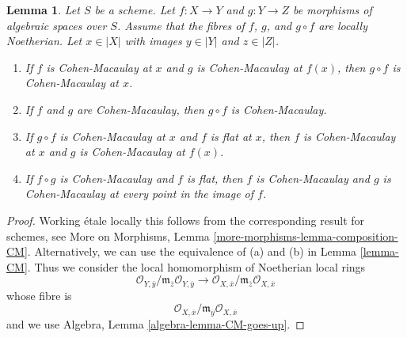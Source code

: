 \documentclass[10pt,a4paper]{amsart}
\theoremstyle{plain}
\newtheorem{lemma}[subsection]{Lemma}
\theoremstyle{definition}
\theoremstyle{remark}
\numberwithin{equation}{subsection}
\begin{document}
\begin{lemma}
\label{lemma-composition-CM}
Let $S$ be a scheme.
Let $f : X \to Y$ and $g : Y \to Z$ be morphisms of algebraic spaces
over $S$. Assume that the
fibres of $f$, $g$, and $g \circ f$ are locally Noetherian.
Let $x \in |X|$ with images $y \in |Y|$ and $z \in |Z|$.
\begin{enumerate}
\item If $f$ is Cohen-Macaulay at $x$ and $g$ is Cohen-Macaulay
at $f(x)$, then $g \circ f$ is Cohen-Macaulay at $x$.
\item If $f$ and $g$ are Cohen-Macaulay, then $g \circ f$ is Cohen-Macaulay.
\item If $g \circ f$ is Cohen-Macaulay at $x$ and $f$ is flat at $x$,
then $f$ is Cohen-Macaulay at $x$ and $g$ is Cohen-Macaulay at $f(x)$.
\item If $f \circ g$ is Cohen-Macaulay and $f$ is flat, then
$f$ is Cohen-Macaulay and $g$ is Cohen-Macaulay at every point in
the image of $f$.
\end{enumerate}
\end{lemma}

\begin{proof}
Working \'etale locally this follows from the corresponding result for
schemes, see
More on Morphisms, Lemma \ref{more-morphisms-lemma-composition-CM}.
Alternatively, we can use the equivalence of (a) and (b) in
Lemma \ref{lemma-CM}. Thus we consider the local homomorphism
of Noetherian local rings
$$
\mathcal{O}_{Y, \overline{y}}/
\mathfrak m_{\overline{z}}\mathcal{O}_{Y, \overline{y}}
\longrightarrow
\mathcal{O}_{X, \overline{x}}/
\mathfrak m_{\overline{z}}\mathcal{O}_{X, \overline{x}}
$$
whose fibre is
$$
\mathcal{O}_{X, \overline{x}}/
\mathfrak m_{\overline{y}}\mathcal{O}_{X, \overline{x}}
$$
and we use Algebra, Lemma \ref{algebra-lemma-CM-goes-up}.
\end{proof}
\end{document}
